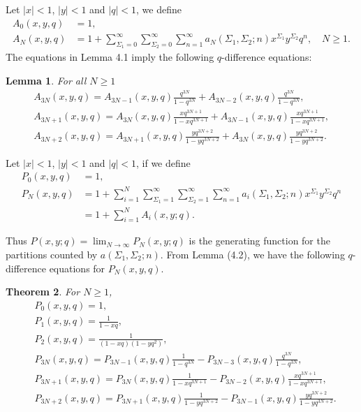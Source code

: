 \documentclass[draft]{amsart}
\numberwithin{equation}{section}
\theoremstyle{plain}
\newtheorem{theorem}{Theorem}[section]
\newtheorem{lemma}[theorem]{Lemma}
\theoremstyle{remark}
\begin{document}
Let $|x|<1$, $|y|<1$ and $|q|<1$, we define
\begin{align*}
A_{0}(x,y,q)&=1, \\
A_{N}(x,y,q)&=1+\sum_{\Sigma_{1}=0}^{\infty}\sum_{\Sigma_{2}=0}^{\infty}\sum_{n=1}^{\infty}a_{N}(\Sigma_{1},\Sigma_{2}; n)x^{\Sigma_{1}}y^{\Sigma_{2}}q^{n},\quad N\geq 1.
\end{align*}
The equations in Lemma 4.1 imply the following $q$-difference equations:
\begin{lemma} For all $N\geq 1$
\begin{align}
A_{3N}(x,y,q)=A_{3N-1}(x,y,q)\frac{q^{3N}}{1-q^{3N}}+A_{3N-2}(x,y,q)\frac{q^{3N}}{1-q^{3N}},\\
A_{3N+1}(x,y,q)=A_{3N}(x,y,q)\frac{xq^{3N+1}}{1-xq^{3N+1}}+A_{3N-1}(x,y,q)\frac{xq^{3N+1}}{1-xq^{3N+1}},\\
A_{3N+2}(x,y,q)=A_{3N+1}(x,y,q)\frac{yq^{3N+2}}{1-yq^{3N+2}}+A_{3N}(x,y,q)\frac{yq^{3N+2}}{1-yq^{3N+2}}.
\end{align}
\end{lemma}
Let $|x|<1$, $|y|<1$ and $|q|<1$, if we define
\begin{align*}
P_{0}(x,y,q)&=1, \\
P_{N}(x,y,q)&=1+\sum_{i=1}^{N}\sum_{\Sigma_{1}=1}^{\infty}\sum_{\Sigma_{2}=1}^{\infty}\sum_{n=1}^{\infty}a_{i}(\Sigma_{1},\Sigma_{2};n)x^{\Sigma_{1}}y^{\Sigma_{2}}q^{n}\\
&=1+\sum_{i=1}^{N}A_{i}(x,y;q).
\end{align*}

Thus $P(x,y;q)= \lim_{N\rightarrow \infty} P_{N}(x,y;q) $ is the generating function for the partitions counted by $a(\Sigma_{1}, \Sigma_{2}; n)$. From  Lemma (4.2), we have the following $q$-difference equations for $P_{N}(x,y,q)$.

\begin{theorem} For $N\geq 1$,
\begin{align}
&P_{0}(x,y,q)=1,\nonumber\\
&P_{1}(x,y,q)=\frac{1}{1-xq},\nonumber\\
&P_{2}(x,y,q)=\frac{1}{(1-xq)(1-yq^{2})},\nonumber\\
&P_{3N}(x,y,q)=P_{3N-1}(x,y,q)\frac{1}{1-q^{3N}}-P_{3N-3}(x,y,q)\frac{q^{3N}}{1-q^{3N}},\label{4.7}\\
&P_{3N+1}(x,y,q)=P_{3N}(x,y,q)\frac{1}{1-xq^{3N+1}}-P_{3N-2}(x,y,q)\frac{xq^{3N+1}}{1-xq^{3N+1}},\label{4.8}\\
&P_{3N+2}(x,y,q)=P_{3N+1}(x,y,q)\frac{1}{1-yq^{3N+2}}-P_{3N-1}(x,y,q)\frac{yq^{3N+2}}{1-yq^{3N+2}}.\label{4.9}
\end{align}
\end{theorem}
\end{document}
